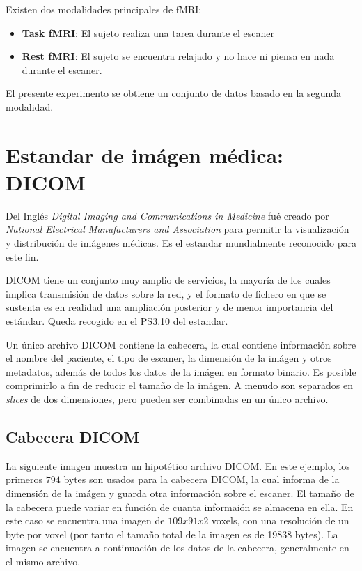 Existen dos modalidades principales de fMRI:

\begin{itemize}
	\item \textbf{Task fMRI}: El sujeto realiza una tarea durante el escaner
	\item \textbf{Rest fMRI}: El sujeto se encuentra relajado y no hace ni piensa en nada durante el escaner.
\end{itemize}

El presente experimento se obtiene un conjunto de datos basado en la segunda modalidad.

\section{Estandar de imágen médica: DICOM}

Del Inglés \textit{Digital Imaging and Communications in Medicine} fué creado por \textit{National Electrical Manufacturers and Association} para permitir la visualización y distribución de imágenes médicas. Es el estandar mundialmente reconocido para este fin.

DICOM tiene un conjunto muy amplio de servicios, la mayoría de los cuales implica transmisión de datos sobre la red, y el formato de fichero en que se sustenta es en realidad una ampliación posterior y de menor importancia del estándar. Queda recogido en el PS3.10 \cite{dicom} del estandar.\cite{nema}

Un único archivo DICOM contiene la cabecera, la cual contiene información sobre el nombre del paciente, el tipo de escaner, la dimensión de la imágen y otros metadatos, además de todos los datos de la imágen en formato binario. Es posible comprimirlo a fin de reducir el tamaño de la imágen. A menudo son separados en \textit{slices} de dos dimensiones, pero pueden ser combinadas en un único archivo.


\subsection{Cabecera DICOM}

La siguiente \hyperref[dicom:dummy_image]{imagen} muestra un hipotético archivo DICOM. En este ejemplo, los primeros $794$ bytes son usados para la cabecera DICOM, la cual informa de la dimensión de la imágen y guarda otra información sobre el escaner. El tamaño de la cabecera puede variar en función de cuanta informaión se almacena en ella. En este caso se encuentra una imagen de $109x91x2$ voxels, con una resolución de un byte por voxel (por tanto el tamaño total de la imagen es de 19838 bytes). La imagen se encuentra a continuación de los datos de la cabecera, generalmente en el mismo archivo.

